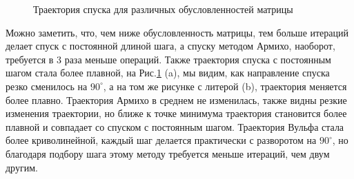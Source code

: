 \documentclass{article}
\begin{document}
	\begin{figure}[H]
		\centering
		\hfill %
		\caption{Траектория спуска для различных обусловленностей матрицы}
		\label{fig:obyslovlenn}
	\end{figure}
	
	\newpage
	Можно заметить, что, чем ниже обусловленность матрицы, тем больше итераций делает спуск с постоянной длиной шага, а спуску методом Армихо, наоборот, требуется в 3 раза меньше операций.
	Также траектория спуска с постоянным шагом стала более плавной, на Рис.\ref{fig:obyslovlenn} (a), мы видим, как направление спуска резко сменилось на $90^{\circ}$, а на том же рисунке с литерой (b), траектория меняется более плавно. Траектория Армихо в среднем не изменилась, также видны резкие изменения траектории, но ближе к точке минимума траектория становится более плавной и совпадает со спуском с постоянным шагом. Траектория Вульфа стала более криволинейной, каждый шаг делается практически с разворотом на $90^{\circ}$, но благодаря подбору шага этому методу требуется меньше итераций, чем двум другим.
	
\end{document}
